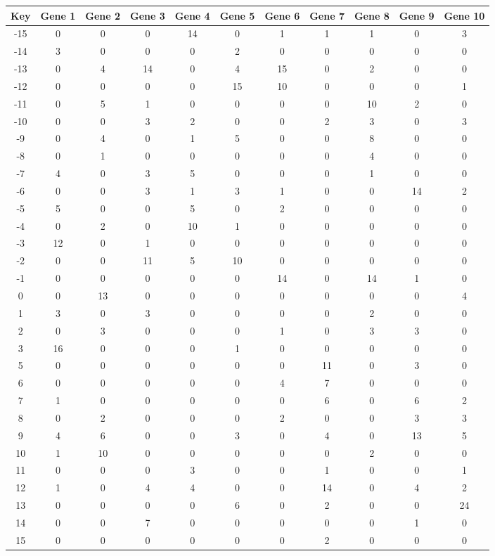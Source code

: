 \begin{tabular}{|c|c|c|c|c|c|c|c|c|c|c|}
\hline
Key & Gene 1 & Gene 2 & Gene 3 & Gene 4 & Gene 5 & Gene 6 & Gene 7 & Gene 8 & Gene 9 & Gene 10 \\
\hline
-15 & 0 & 0 & 0 & 14 & 0 & 1 & 1 & 1 & 0 & 3 \\
-14 & 3 & 0 & 0 & 0 & 2 & 0 & 0 & 0 & 0 & 0 \\
-13 & 0 & 4 & 14 & 0 & 4 & 15 & 0 & 2 & 0 & 0 \\
-12 & 0 & 0 & 0 & 0 & 15 & 10 & 0 & 0 & 0 & 1 \\
-11 & 0 & 5 & 1 & 0 & 0 & 0 & 0 & 10 & 2 & 0 \\
-10 & 0 & 0 & 3 & 2 & 0 & 0 & 2 & 3 & 0 & 3 \\
-9 & 0 & 4 & 0 & 1 & 5 & 0 & 0 & 8 & 0 & 0 \\
-8 & 0 & 1 & 0 & 0 & 0 & 0 & 0 & 4 & 0 & 0 \\
-7 & 4 & 0 & 3 & 5 & 0 & 0 & 0 & 1 & 0 & 0 \\
-6 & 0 & 0 & 3 & 1 & 3 & 1 & 0 & 0 & 14 & 2 \\
-5 & 5 & 0 & 0 & 5 & 0 & 2 & 0 & 0 & 0 & 0 \\
-4 & 0 & 2 & 0 & 10 & 1 & 0 & 0 & 0 & 0 & 0 \\
-3 & 12 & 0 & 1 & 0 & 0 & 0 & 0 & 0 & 0 & 0 \\
-2 & 0 & 0 & 11 & 5 & 10 & 0 & 0 & 0 & 0 & 0 \\
-1 & 0 & 0 & 0 & 0 & 0 & 14 & 0 & 14 & 1 & 0 \\
0 & 0 & 13 & 0 & 0 & 0 & 0 & 0 & 0 & 0 & 4 \\
1 & 3 & 0 & 3 & 0 & 0 & 0 & 0 & 2 & 0 & 0 \\
2 & 0 & 3 & 0 & 0 & 0 & 1 & 0 & 3 & 3 & 0 \\
3 & 16 & 0 & 0 & 0 & 1 & 0 & 0 & 0 & 0 & 0 \\
5 & 0 & 0 & 0 & 0 & 0 & 0 & 11 & 0 & 3 & 0 \\
6 & 0 & 0 & 0 & 0 & 0 & 4 & 7 & 0 & 0 & 0 \\
7 & 1 & 0 & 0 & 0 & 0 & 0 & 6 & 0 & 6 & 2 \\
8 & 0 & 2 & 0 & 0 & 0 & 2 & 0 & 0 & 3 & 3 \\
9 & 4 & 6 & 0 & 0 & 3 & 0 & 4 & 0 & 13 & 5 \\
10 & 1 & 10 & 0 & 0 & 0 & 0 & 0 & 2 & 0 & 0 \\
11 & 0 & 0 & 0 & 3 & 0 & 0 & 1 & 0 & 0 & 1 \\
12 & 1 & 0 & 4 & 4 & 0 & 0 & 14 & 0 & 4 & 2 \\
13 & 0 & 0 & 0 & 0 & 6 & 0 & 2 & 0 & 0 & 24 \\
14 & 0 & 0 & 7 & 0 & 0 & 0 & 0 & 0 & 1 & 0 \\
15 & 0 & 0 & 0 & 0 & 0 & 0 & 2 & 0 & 0 & 0 \\
\hline
\end{tabular}